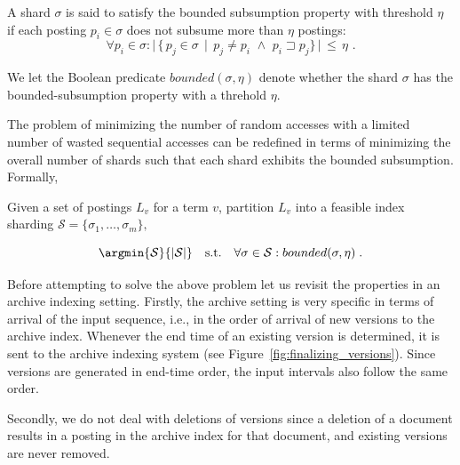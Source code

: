 \begin{definition}
A shard $\sigma$ is said to satisfy the bounded subsumption property with threshold $\eta$ if each posting $p_i \in \sigma$ does not subsume more than $\eta $ postings:
$$ \forall p_i \in \sigma: \vert \,\{ \, p_j \in \sigma \, \mid \, p_j \neq p_i \,\, \wedge \,\, p_i \sqsupset p_j \} \,\vert \,\leq \, \eta  \,\,.
$$

We let the Boolean predicate $bounded(\sigma, \eta)$ denote whether the shard $\sigma$ has the bounded-subsumption property with a threhold $\eta$.
\end{definition}

The problem of minimizing the number of random accesses with a limited number of wasted sequential accesses can be redefined in terms of minimizing the overall number of shards such that each shard exhibits the bounded subsumption. Formally,

\begin{definition} 
Given a set of postings $L_v$ for a term $v$, partition $L_v$ into a feasible index sharding $\mathcal{S} = \{\sigma_1, \ldots, \sigma_{m}\},$ 


$$
  \argmin{\mathcal{S}}{|\mathcal{S}|}  \quad\mbox{s.t.} \quad \forall \sigma \in \mathcal{S} : bounded(\sigma, \eta) \;.
$$

\end{definition}

Before attempting to solve the above problem let us revisit the properties in an archive indexing setting. Firstly, the archive setting is very specific in terms of arrival of the input sequence, i.e., in the order of arrival of new versions to the archive index. Whenever the end time of an existing version is determined, it is sent to the archive indexing system (see Figure~\ref{fig:finalizing_versions}). Since versions are generated in end-time order, the input intervals also follow the same order. 

Secondly, we do not deal with deletions of versions since a deletion of a document results in a posting in the archive index for that document, and existing versions are never removed. 


